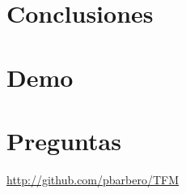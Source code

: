 \documentclass[10pt, spanish]{beamer}
\begin{document}
\section{Conclusiones}
\begin{frame}

\end{frame}

\section{Demo}
\begin{frame}

\end{frame}

\section{Preguntas}

\begin{frame}
	\begin{center}
		\href{http://github.com/pbarbero/TFM}{http://github.com/pbarbero/TFM}
	\end{center}
\end{frame}
\end{document}

